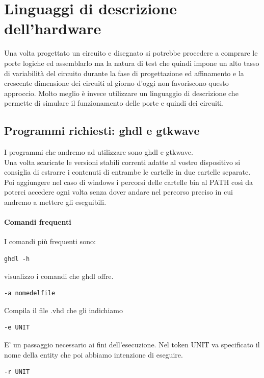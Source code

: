\documentclass[a4paper]{book}
\begin{document}
\chapter{Linguaggi di descrizione dell'hardware}

Una volta progettato un circuito e disegnato si potrebbe procedere a comprare le porte logiche ed assemblarlo ma la natura di test che quindi impone un alto tasso di variabilità del circuito durante la fase di progettazione ed affinamento e la crescente dimensione dei circuiti al giorno d'oggi non favoriscono questo approccio.
Molto meglio è invece utilizzare un linguaggio di descrizione che permette di simulare il funzionamento delle porte e quindi dei circuiti.


\section{Programmi richiesti: ghdl e gtkwave}

I programmi che andremo ad utilizzare sono ghdl e gtkwave.\\
Una volta scaricate le versioni stabili correnti adatte al vostro dispositivo si consiglia di estrarre i contenuti di entrambe le cartelle in due cartelle separate.\\
Poi aggiungere nel caso di windows i percorsi delle cartelle bin al PATH così da poterci accedere ogni volta senza dover andare nel percorso preciso in cui andremo a mettere gli eseguibili.

\subsubsection{Comandi frequenti}

I comandi più frequenti sono:

\begin{verbatim}ghdl -h \end{verbatim}visualizzo i comandi che ghdl offre.

\begin{verbatim}
-a nomedelfile
\end{verbatim}
Compila il file .vhd che gli indichiamo
\begin{verbatim}
-e UNIT
\end{verbatim}
E' un passaggio necessario ai fini dell'esecuzione. Nel token UNIT va specificato il nome della entity che poi abbiamo intenzione di eseguire.
\begin{verbatim}
-r UNIT
\end{verbatim}
\end{document}
